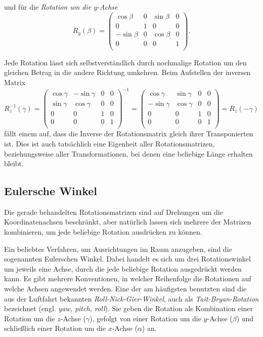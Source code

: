 und für die \emph{Rotation um die $y$-Achse}
\begin{equation}
 R_y{(\beta)}
 = 
 \begin{pmatrix}
  \cos \beta & 0 & \sin \beta & 0 \\
  0 & 1 & 0 & 0 \\
  -\sin \beta & 0 & \cos \beta & 0 \\
  0 & 0 & 0 & 1 \\
 \end{pmatrix}.
\end{equation}

Jede Rotation lässt sich selbstverständlich durch nochmalige Rotation um den gleichen Betrag in die andere Richtung umkehren. Beim Aufstellen der inversen Matrix
\begin{equation}
 R_z^{-1}{(\gamma)}
 = 
 \begin{pmatrix}
  \cos \gamma & -\sin \gamma & 0 & 0 \\
  \sin \gamma &  \cos \gamma & 0 & 0 \\
  0 & 0 & 1 & 0 \\
  0 & 0 & 0 & 1 \\
 \end{pmatrix}^{-1}
 = 
 \begin{pmatrix}
   \cos \gamma & \sin \gamma & 0 & 0 \\
  -\sin \gamma & \cos \gamma & 0 & 0 \\
  0 & 0 & 1 & 0 \\
  0 & 0 & 0 & 1 \\
 \end{pmatrix}
 = R_z{(-\gamma)}
\end{equation}
fällt einem auf, dass die Inverse der Rotationsmatrix gleich ihrer Transponierten ist. Dies ist auch tatsächlich eine Eigenheit aller Rotationsmatrizen, beziehungsweise aller Transformationen, bei denen eine beliebige Länge erhalten bleibt.

\subsection{Eulersche Winkel}
Die gerade behandelten Rotationsmatrizen sind auf Drehungen um die Koordinatenachsen beschränkt, aber natürlich lassen sich mehrere der Matrizen kombinieren, um jede beliebige Rotation ausdrücken zu können.

Ein beliebtes Verfahren, um Ausrichtungen im Raum anzugeben, sind die sogenannten Eulerschen Winkel. Dabei handelt es sich um drei Rotationswinkel um jeweils eine Achse, durch die jede beliebige Rotation ausgedrückt werden kann. Es gibt mehrere Konventionen, in welcher Reihenfolge die Rotationen auf welche Achsen angewendet werden. Eine der am häufigsten benutzten sind die aus der Luftfahrt bekannten \emph{Roll-Nick-Gier-Winkel}, auch als \emph{Tait-Bryan-Rotation} bezeichnet (engl. \emph{yaw, pitch, roll}). Sie geben die Rotation als Kombination einer Rotation um die $z$-Achse ($\gamma$), gefolgt von einer Rotation um die $y$-Achse ($\beta$) und schließlich einer Rotation um die $x$-Achse ($\alpha$) an.

